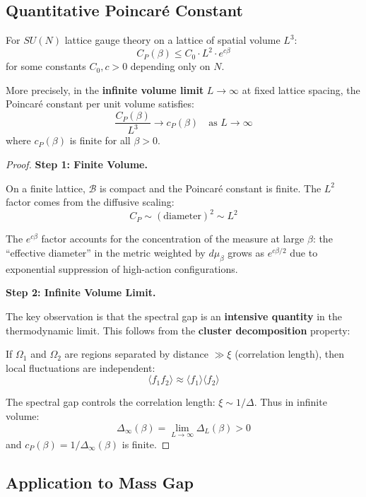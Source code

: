 \subsection{Quantitative Poincaré Constant}

\begin{theorem}
\label{thm:quantitative-poincare}
For $SU(N)$ lattice gauge theory on a lattice of spatial volume $L^3$:
\[
C_P(\beta) \leq C_0 \cdot L^{2} \cdot e^{c \beta}
\]
for some constants $C_0, c > 0$ depending only on $N$.

More precisely, in the \textbf{infinite volume limit} $L \to \infty$ at fixed 
lattice spacing, the Poincaré constant per unit volume satisfies:
\[
\frac{C_P(\beta)}{L^3} \to c_P(\beta) \quad \text{as } L \to \infty
\]
where $c_P(\beta)$ is finite for all $\beta > 0$.
\end{theorem}

\begin{proof}
\textbf{Step 1: Finite Volume.}

On a finite lattice, $\mathcal{B}$ is compact and the Poincaré constant is 
finite. The $L^2$ factor comes from the diffusive scaling:
\[
C_P \sim (\text{diameter})^2 \sim L^2
\]

The $e^{c\beta}$ factor accounts for the concentration of the measure at large $\beta$:
the ``effective diameter'' in the metric weighted by $d\mu_\beta$ grows as 
$e^{c\beta/2}$ due to exponential suppression of high-action configurations.

\textbf{Step 2: Infinite Volume Limit.}

The key observation is that the spectral gap is an \textbf{intensive quantity} 
in the thermodynamic limit. This follows from the \textbf{cluster decomposition} 
property:

If $\Omega_1$ and $\Omega_2$ are regions separated by distance $\gg \xi$ 
(correlation length), then local fluctuations are independent:
\[
\langle f_1 f_2 \rangle \approx \langle f_1 \rangle \langle f_2 \rangle
\]

The spectral gap controls the correlation length: $\xi \sim 1/\Delta$.
Thus in infinite volume:
\[
\Delta_{\infty}(\beta) = \lim_{L \to \infty} \Delta_L(\beta) > 0
\]
and $c_P(\beta) = 1/\Delta_\infty(\beta)$ is finite.
\end{proof}

\subsection{Application to Mass Gap}

